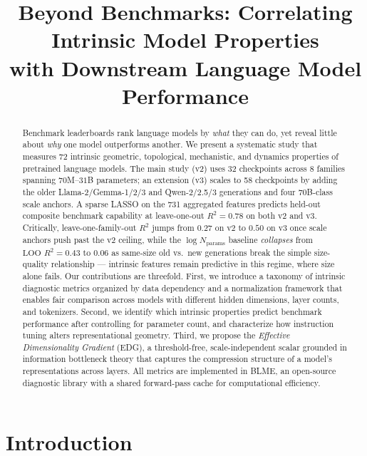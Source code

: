 \documentclass[preprint]{neurips_2025}
\title{Beyond Benchmarks: Correlating Intrinsic Model Properties\\with Downstream Language Model Performance}
\author{
}
\begin{document}
\maketitle

\begin{abstract}
Benchmark leaderboards rank language models by \emph{what} they can do, yet reveal little about \emph{why} one model outperforms another.
We present a systematic study that measures 72 intrinsic geometric, topological, mechanistic, and dynamics properties of pretrained language models. The main study (v2) uses 32 checkpoints across 8 families spanning $70$M--$31$B parameters; an extension (v3) scales to 58 checkpoints by adding the older Llama-2/Gemma-1/2/3 and Qwen-2/2.5/3 generations and four 70B-class scale anchors. A sparse LASSO on the 731 aggregated features predicts held-out composite benchmark capability at leave-one-out $R^2 = 0.78$ on both v2 and v3. Critically, leave-one-family-out $R^2$ jumps from $0.27$ on v2 to $0.50$ on v3 once scale anchors push past the v2 ceiling, while the $\log N_{\text{params}}$ baseline \emph{collapses} from $\text{LOO } R^2 = 0.43$ to $0.06$ as same-size old vs.\ new generations break the simple size-quality relationship --- intrinsic features remain predictive in this regime, where size alone fails.
Our contributions are threefold.
First, we introduce a taxonomy of intrinsic diagnostic metrics organized by data dependency and a normalization framework that enables fair comparison across models with different hidden dimensions, layer counts, and tokenizers.
Second, we identify which intrinsic properties predict benchmark performance after controlling for parameter count, and characterize how instruction tuning alters representational geometry.
Third, we propose the \emph{Effective Dimensionality Gradient} (EDG), a threshold-free, scale-independent scalar grounded in information bottleneck theory that captures the compression structure of a model's representations across layers.
All metrics are implemented in BLME, an open-source diagnostic library with a shared forward-pass cache for computational efficiency.
\end{abstract}

\section{Introduction}
\label{sec:introduction}
\end{document}
